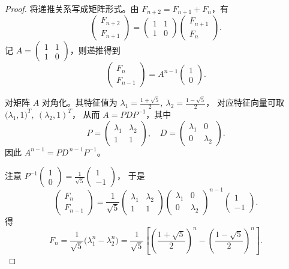\begin{proof}
将递推关系写成矩阵形式。由
\(F_{n+2}=F_{n+1}+F_n\)，有
\[
\begin{pmatrix}F_{n+2}\\ F_{n+1}\end{pmatrix}
=
\begin{pmatrix}1&1\\1&0\end{pmatrix}
\begin{pmatrix}F_{n+1}\\ F_n\end{pmatrix}.
\]
记 \(A=\begin{pmatrix}1&1\\1&0\end{pmatrix}\)，则递推得到
\[
\begin{pmatrix}F_n\\ F_{n-1}\end{pmatrix}
= A^{n-1}\begin{pmatrix}1\\0\end{pmatrix}.
\]

对矩阵 \(A\) 对角化。其特征值为
\(\lambda_1=\frac{1+\sqrt5}{2},\ \lambda_2=\frac{1-\sqrt5}{2}\)，
对应特征向量可取
\(\bigl(\lambda_1,1\bigr)^T,\ (\lambda_2,1)^T\)，
从而 \(A=PDP^{-1}\)，其中
\[
P=\begin{pmatrix}\lambda_1&\lambda_2\\1&1\end{pmatrix},\quad
D=\begin{pmatrix}\lambda_1&0\\0&\lambda_2\end{pmatrix}.
\]
因此 \(A^{n-1}=PD^{\,n-1}P^{-1}\)。

注意 \(P^{-1}\begin{pmatrix}1\\0\end{pmatrix}
=\frac1{\sqrt5}\begin{pmatrix}1\\-1\end{pmatrix}\)，
于是
\[
\begin{pmatrix}F_n\\ F_{n-1}\end{pmatrix}
= \frac1{\sqrt5}
\begin{pmatrix}\lambda_1&\lambda_2\\1&1\end{pmatrix}
\begin{pmatrix}\lambda_1 &0\\0&\lambda_2\end{pmatrix}^{n-1}
\begin{pmatrix} 1\\ -1\end{pmatrix}.
\]
得
\[
F_n=\frac{1}{\sqrt5}\bigl(\lambda_1^n-\lambda_2^n\bigr)
=\frac{1}{\sqrt5}\left[\left(\frac{1+\sqrt5}{2}\right)^n-\left(\frac{1-\sqrt5}{2}\right)^n\right].
\]
\end{proof}


